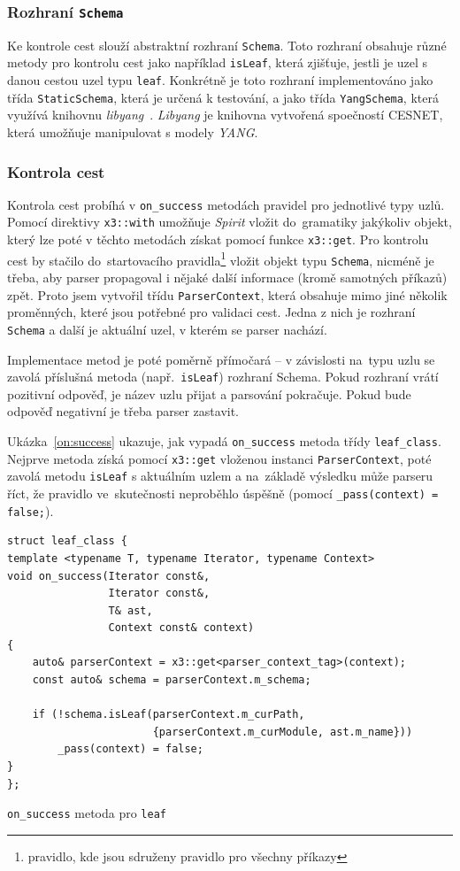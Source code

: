 \documentclass[thesis=B,czech,hidelinks]{FITthesis}[2019/03/06]
\begin{document}
\subsubsection{Rozhraní \texttt{Schema}}
Ke kontrole cest slouží abstraktní rozhraní \texttt{Schema}. Toto rozhraní obsahuje různé metody pro kontrolu cest jako například \texttt{isLeaf}, která zjišťuje, jestli je uzel s danou cestou uzel typu \texttt{leaf}. Konkrétně je toto rozhraní implementováno jako třída \texttt{StaticSchema}, která je určená k testování, a jako třída \texttt{YangSchema}, která využívá knihovnu \textit{libyang}~\cite{libyang}. \textit{Libyang} je knihovna vytvořená spoečností CESNET, která umožňuje manipulovat s modely \textit{YANG}.

\subsubsection{Kontrola cest}\label{path:checking}
Kontrola cest probíhá v \verb¨on_success¨ metodách pravidel pro jednotlivé typy uzlů. Pomocí direktivy \texttt{x3::with} umožňuje \textit{Spirit} vložit do~gramatiky jakýkoliv objekt, který lze poté v těchto metodách získat pomocí funkce \texttt{x3::get}. Pro kontrolu cest by stačilo do~startovacího pravidla\footnote{pravidlo, kde jsou sdruženy pravidlo pro všechny příkazy} vložit objekt typu \texttt{Schema}, nicméně je třeba, aby parser propagoval i nějaké další informace (kromě samotných příkazů) zpět. Proto jsem vytvořil třídu \texttt{ParserContext}, která obsahuje mimo jiné několik proměnných, které jsou potřebné pro validaci cest. Jedna z nich je rozhraní \texttt{Schema} a další je aktuální uzel, v kterém se parser nachází.

Implementace metod je poté poměrně přímočará -- v závislosti na~typu uzlu se zavolá příslušná metoda (např.\ \texttt{isLeaf}) rozhraní Schema. Pokud rozhraní vrátí pozitivní odpověď, je název uzlu přijat a parsování pokračuje. Pokud bude odpověď negativní je třeba parser zastavit.

Ukázka~\ref{on:success} ukazuje, jak vypadá \verb¨on_success¨ metoda třídy \texttt{leaf\_class}. Nejprve metoda získá pomocí \texttt{x3::get} vloženou instanci \texttt{ParserContext}, poté zavolá metodu \texttt{isLeaf} s aktuálním uzlem a na~základě výsledku může parseru říct, že pravidlo ve~skutečnosti neproběhlo úspěšně (pomocí \verb¨_pass(context) = false;¨).

\begin{listing}[H]
\begin{verbatim}
struct leaf_class {
template <typename T, typename Iterator, typename Context>
void on_success(Iterator const&,
                Iterator const&,
                T& ast,
                Context const& context)
{
    auto& parserContext = x3::get<parser_context_tag>(context);
    const auto& schema = parserContext.m_schema;

    if (!schema.isLeaf(parserContext.m_curPath,
                       {parserContext.m_curModule, ast.m_name}))
        _pass(context) = false;
}
};
\end{verbatim}
\caption{\texttt{on\_success} metoda pro \texttt{leaf}}\label{on:success}
\end{listing}
\end{document}
